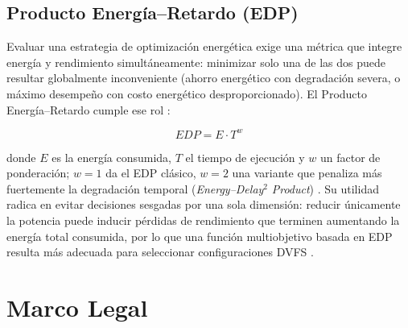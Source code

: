 \documentclass[12pt,oneside,spanish]{book}
\begin{document}
\subsection{Producto Energía--Retardo (EDP)}

Evaluar una estrategia de optimización energética exige una métrica que integre energía y rendimiento simultáneamente: minimizar solo una de las dos puede resultar globalmente inconveniente (ahorro energético con degradación severa, o máximo desempeño con costo energético desproporcionado). El Producto Energía--Retardo cumple ese rol \cite{Laros2013}:

\begin{equation}
EDP = E \cdot T^{w}
\end{equation}

donde $E$ es la energía consumida, $T$ el tiempo de ejecución y $w$ un factor de ponderación; $w=1$ da el EDP clásico, $w=2$ una variante que penaliza más fuertemente la degradación temporal (\textit{Energy--Delay}$^2$ \textit{Product}) \cite{Ali2023,Laros2013}. Su utilidad radica en evitar decisiones sesgadas por una sola dimensión: reducir únicamente la potencia puede inducir pérdidas de rendimiento que terminen aumentando la energía total consumida, por lo que una función multiobjetivo basada en EDP resulta más adecuada para seleccionar configuraciones DVFS \cite{Ali2023}.



\section{Marco Legal}

\end{document}
